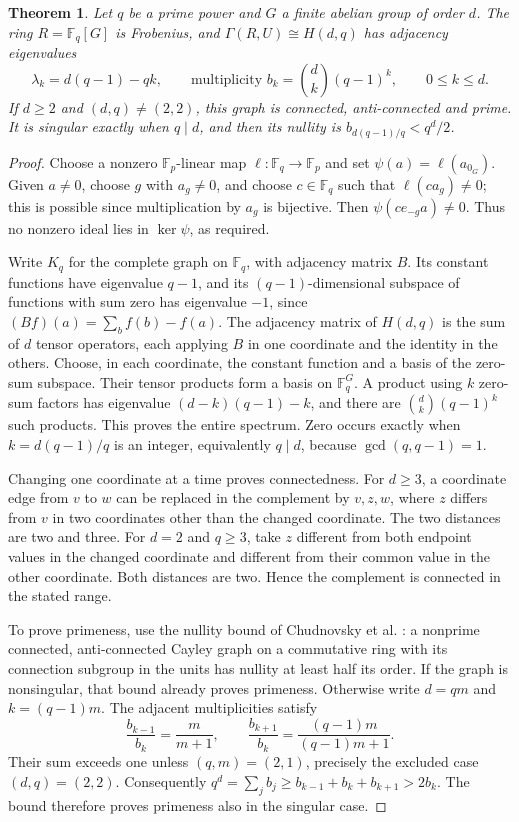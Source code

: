 \documentclass[10pt]{article}
\newtheorem{theorem}{Theorem}
\newcommand{\F}{\mathbb F}
\begin{document}
\begin{theorem}\label{thm:hamming}
Let $q$ be a prime power and $G$ a finite abelian group of order $d$.
The ring $R=\F_q[G]$ is Frobenius, and $\Gamma(R,U)\cong H(d,q)$
has adjacency eigenvalues
\[
 \lambda_k=d(q-1)-qk,\qquad
 \text{multiplicity }b_k=\binom dk(q-1)^k,\qquad 0\leq k\leq d.
\]
If $d\geq2$ and $(d,q)\neq(2,2)$, this graph is connected,
anti-connected and prime. It is singular exactly when $q\mid d$,
and then its nullity is $b_{d(q-1)/q}<q^d/2$.
\end{theorem}
\begin{proof}
Choose a nonzero $\F_p$-linear map $\ell:\F_q\to\F_p$ and set
$\psi(a)=\ell(a_{0_G})$. Given $a\neq0$, choose $g$ with
$a_g\neq0$, and choose $c\in\F_q$ such that $\ell(ca_g)\neq0$;
this is possible since multiplication by $a_g$ is bijective.
Then $\psi(ce_{-g}a)\neq0$. Thus no nonzero ideal lies in
$\ker\psi$, as required.

Write $K_q$ for the complete graph on $\F_q$, with adjacency matrix
$B$. Its constant functions have eigenvalue $q-1$, and its
$(q-1)$-dimensional subspace of functions with sum zero has
eigenvalue $-1$, since
$(Bf)(a)=\sum_b f(b)-f(a)$. The adjacency matrix of $H(d,q)$
is the sum of $d$ tensor operators, each applying $B$ in one
coordinate and the identity in the others. Choose, in each coordinate,
the constant function and a basis of the zero-sum subspace. Their
tensor products form a basis on $\F_q^G$. A product using $k$
zero-sum factors has eigenvalue $(d-k)(q-1)-k$, and there are
$\binom dk(q-1)^k$ such products. This proves the entire spectrum.
Zero occurs exactly when $k=d(q-1)/q$ is an integer, equivalently
$q\mid d$, because $\gcd(q,q-1)=1$.

Changing one coordinate at a time proves connectedness. For $d\geq3$,
a coordinate edge from $v$ to $w$ can be replaced in the complement
by $v,z,w$, where $z$ differs from $v$ in two coordinates other
than the changed coordinate. The two distances are two and three.
For $d=2$ and $q\geq3$, take $z$ different from both endpoint
values in the changed coordinate and different from their common
value in the other coordinate. Both distances are two. Hence the
complement is connected in the stated range.

To prove primeness, use the nullity bound of Chudnovsky et al.
\cite[Corollary 4.3]{CC}: a nonprime connected, anti-connected
Cayley graph on a commutative ring with its connection subgroup
in the units has nullity at least half its order. If the graph is
nonsingular, that bound already proves primeness. Otherwise write
$d=qm$ and $k=(q-1)m$. The adjacent multiplicities satisfy
\[
 \frac{b_{k-1}}{b_k}=\frac{m}{m+1},\qquad
 \frac{b_{k+1}}{b_k}=\frac{(q-1)m}{(q-1)m+1}.
\]
Their sum exceeds one unless $(q,m)=(2,1)$, precisely the excluded
case $(d,q)=(2,2)$. Consequently
$q^d=\sum_j b_j\geq b_{k-1}+b_k+b_{k+1}>2b_k$.
The bound therefore proves primeness also in the singular case.
\end{proof}
\end{document}
